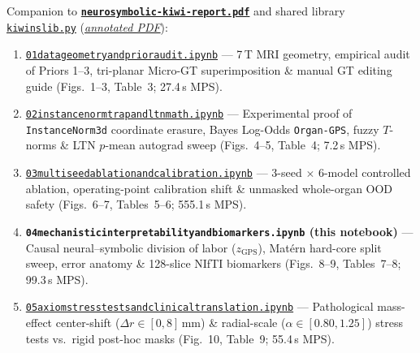 \documentclass[10pt,a4paper]{article}
\renewcommand{\_}{\origunderscore\allowbreak}
\newcommand{\ghblob}{https://github.com/arvidl/BMED365-2027/blob/main}
\newcommand{\repodir}{Lab4-Comp-Imag/Kiwi-challenge/docs/neurosymbolic-report}
\begin{document}
\begin{seqbox}
{\footnotesize Companion to \href{\ghblob/\repodir/neurosymbolic-kiwi-report.pdf}{\textbf{\texttt{neurosymbolic-kiwi-report.pdf}}} and shared library \href{\ghblob/\repodir/notebooks/kiwi_ns_lib.py}{\texttt{kiwi\_ns\_lib.py}} (\href{\ghblob/\repodir/notebooks/kiwi_ns_lib_py.pdf}{\textit{annotated PDF}}):}
\begin{enumerate}[start=1, itemsep=1.2pt, topsep=2pt, font=\footnotesize]
    \item \href{\ghblob/\repodir/notebooks/01_data_geometry_and_prior_audit.ipynb}{\texttt{01\_data\_geometry\_and\_prior\_audit.ipynb}} --- 7\,T MRI geometry, empirical audit of Priors 1--3, tri-planar Micro-GT superimposition \& manual GT editing guide (Figs.\ 1--3, Table~3; 27.4\,s MPS).
    \item \href{\ghblob/\repodir/notebooks/02_instancenorm_trap_and_ltn_math.ipynb}{\texttt{02\_instancenorm\_trap\_and\_ltn\_math.ipynb}} --- Experimental proof of \texttt{InstanceNorm3d} coordinate erasure, Bayes Log-Odds \texttt{Organ-GPS}, fuzzy $T$-norms \& LTN $p$-mean autograd sweep (Figs.\ 4--5, Table~4; 7.2\,s MPS).
    \item \href{\ghblob/\repodir/notebooks/03_multiseed_ablation_and_calibration.ipynb}{\texttt{03\_multiseed\_ablation\_and\_calibration.ipynb}} --- 3-seed $\times$ 6-model controlled ablation, operating-point calibration shift \& unmasked whole-organ OOD safety (Figs.\ 6--7, Tables~5--6; 555.1\,s MPS).
    \item \textbf{\texttt{04\_mechanistic\_interpretability\_and\_biomarkers.ipynb} (this notebook)} --- Causal neural--symbolic division of labor ($z_{\text{GPS}}$), Mat\'ern hard-core split sweep, error anatomy \& 128-slice NIfTI biomarkers (Figs.\ 8--9, Tables~7--8; 99.3\,s MPS).
    \item \href{\ghblob/\repodir/notebooks/05_axiom_stress_tests_and_clinical_translation.ipynb}{\texttt{05\_axiom\_stress\_tests\_and\_clinical\_translation.ipynb}} --- Pathological mass-effect center-shift ($\Delta r \in [0, 8]$\,mm) \& radial-scale ($\alpha \in [0.80, 1.25]$) stress tests vs.\ rigid post-hoc masks (Fig.\ 10, Table~9; 55.4\,s MPS).
\end{enumerate}
\end{seqbox}
\end{document}
